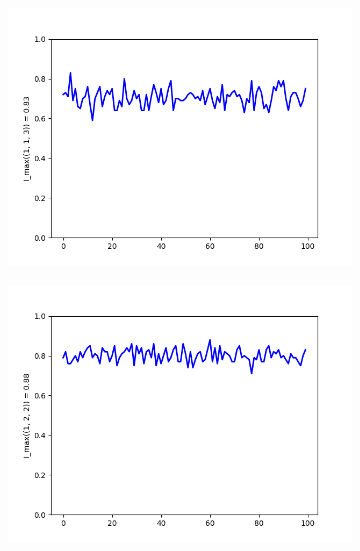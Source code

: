 \documentclass{llncs}
\begin{document}
\begin{figure}

\begin{subfigure}{0.5\linewidth}
\centering\includegraphics[scale=0.4]{images/1-1-3-max-consistent-partitions.png}
\end{subfigure}
\begin{subfigure}{0.5\linewidth}
\centering\includegraphics[scale=0.4]{images/1-2-2-max-consistent-partitions.png}
\end{subfigure}

\end{figure}
\end{document}
